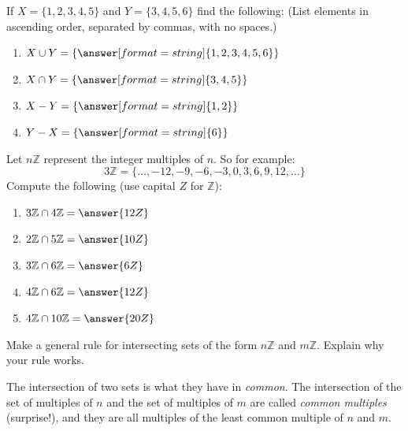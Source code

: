 \documentclass[nooutcomes]{ximera}
\renewcommand{\Z}{\mathbb Z}
\begin{document}
\begin{problem}
If $X = \{1,2,3,4,5\}$ and $Y = \{3,4,5,6\}$ find the following: (List elements in ascending order, separated by commas, with no spaces.)
\begin{enumerate}
\item $X\cup Y = \{\answer[format=string]{1,2,3,4,5,6}\}$
\item $X\cap Y = \{\answer[format=string]{3,4,5}\}$
\item $X-Y = \{\answer[format=string]{1,2}\}$
\item $Y-X = \{\answer[format=string]{6}\}$
\end{enumerate}
\end{problem}

\begin{problem}
Let $n\mathbb Z$ represent the integer multiples of $n$. So for example:
\[
3\mathbb Z = \{\dots,-12,-9,-6,-3,0,3,6,9,12,\dots\}
\]
Compute the following (use capital $Z$ for $\mathbb Z$):
\begin{enumerate}
\item $3\mathbb Z\cap 4\mathbb Z = \answer{12Z}$ 
\item $2\mathbb Z\cap 5\mathbb Z = \answer{10Z}$
\item $3\mathbb Z\cap 6\mathbb Z = \answer{6Z}$
\item $4\mathbb Z\cap 6\mathbb Z = \answer{12Z}$
\item $4\mathbb Z\cap 10\mathbb Z = \answer{20Z}$
\end{enumerate}
\end{problem}


\begin{problem}
Make a general rule for intersecting sets of the form $n\mathbb Z$ and
  $m\mathbb Z$. Explain why your rule works.
\begin{freeResponse}
\begin{hint}
The intersection of two sets is what they have in \emph{common}.  The intersection of the set of multiples of $n$ and the set of multiples of $m$ are called \emph{common multiples} (surprise!), and they are all multiples of the least common multiple of $n$ and $m$.  
\end{hint}
\end{freeResponse}
\end{problem}
\end{document}
